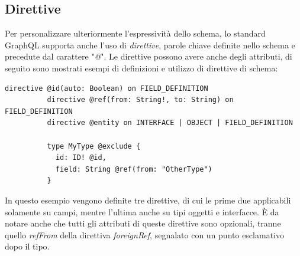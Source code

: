\documentclass[a4paper, 12pt]{report}
\begin{document}
      \subsection{Direttive}
        Per personalizzare ulteriormente l'espressività dello schema, lo standard GraphQL supporta anche l'uso di \emph{direttive}, parole chiave definite nello schema e precedute dal carattere "\emph{@}".
        Le direttive possono avere anche degli attributi, di seguito sono mostrati esempi di definizioni e utilizzo di direttive di schema:
        \begin{Verbatim}[samepage=true]
          directive @id(auto: Boolean) on FIELD_DEFINITION
          directive @ref(from: String!, to: String) on FIELD_DEFINITION
          directive @entity on INTERFACE | OBJECT | FIELD_DEFINITION

          type MyType @exclude {
            id: ID! @id,
            field: String @ref(from: "OtherType") 
          }
        \end{Verbatim}
        In questo esempio vengono definite tre direttive, di cui le prime due applicabili solamente su campi, mentre l'ultima anche su tipi oggetti e interfacce.
        È da notare anche che tutti gli attributi di queste direttive sono opzionali, tranne quello \emph{refFrom} della direttiva \emph{foreignRef}, segnalato con un punto esclamativo dopo il tipo.
\end{document}
